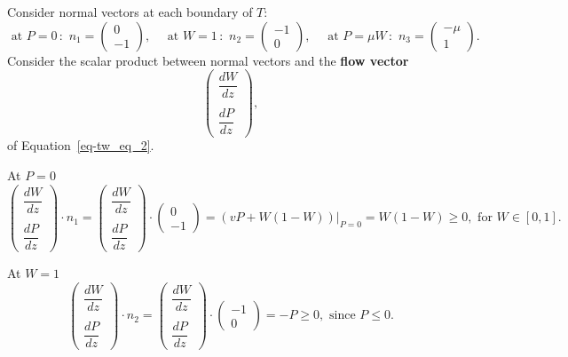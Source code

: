 \documentclass[
  letterpaper,
  DIV=11,
  numbers=noendperiod]{scrreprt}
\theoremstyle{plain}
\theoremstyle{definition}
\theoremstyle{plain}
\theoremstyle{remark}
\begin{document}
Consider normal vectors at each boundary of \(T\): \[
\text{ at } P = 0 \, : \, \, n_1 = \begin{pmatrix} 
0 \\ -1
\end{pmatrix}, \quad 
\text{ at } W= 1 \, : \, \, n_2 = \begin{pmatrix} 
-1\\ 0
\end{pmatrix}, \quad 
\text{ at } P = \mu W \, : \, \, n_3 = \begin{pmatrix} 
-\mu \\1
\end{pmatrix}.
\] Consider the scalar product between normal vectors and the
\textbf{flow vector} \[
\begin{pmatrix} 
\dfrac{ dW}{dz} \\ \\  \dfrac{dP}{dz}
\end{pmatrix},
\] of Equation~\ref{eq-tw_eq_2}.

At \(P=0\) \[
\begin{pmatrix} 
\dfrac{ dW}{dz} \\  \\ \dfrac{dP}{dz}
\end{pmatrix} \cdot n_1 = \begin{pmatrix} 
\dfrac{ dW}{dz} \\  \\ \dfrac{dP}{dz}
\end{pmatrix}\cdot  \begin{pmatrix} 
0 \\ -1
\end{pmatrix} =  \left(v P + W(1-W)\right) \Big|_{P=0} =  W(1-W) \geq 0 , \text{ for } W\in [0,1].
\]

At \(W=1\) \[
\begin{pmatrix} 
\dfrac{ dW}{dz} \\  \\ \dfrac{dP}{dz}
\end{pmatrix} \cdot n_2 = \begin{pmatrix} 
\dfrac{ dW}{dz} \\  \\ \dfrac{dP}{dz}
\end{pmatrix}\cdot  \begin{pmatrix} 
-1 \\ 0
\end{pmatrix} =  -P  \geq 0 , \text{ since }P \leq 0.
\]
\end{document}
